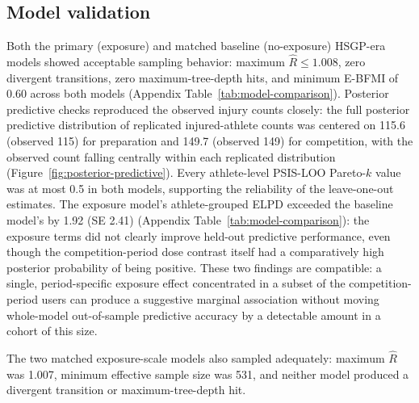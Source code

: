 \subsection{Model validation}
\label{sec:results-validation}
Both the primary (exposure) and matched baseline (no-exposure) HSGP-era models showed acceptable sampling behavior: maximum $\hat{R} \leq 1.008$, zero divergent transitions, zero maximum-tree-depth hits, and minimum E-BFMI of 0.60 across both models (Appendix Table~\ref{tab:model-comparison}). Posterior predictive checks reproduced the observed injury counts closely: the full posterior predictive distribution of replicated injured-athlete counts was centered on 115.6 (observed 115) for preparation and 149.7 (observed 149) for competition, with the observed count falling centrally within each replicated distribution (Figure~\ref{fig:posterior-predictive}). Every athlete-level PSIS-LOO Pareto-$k$ value was at most 0.5 in both models, supporting the reliability of the leave-one-out estimates. The exposure model's athlete-grouped ELPD exceeded the baseline model's by 1.92 (SE 2.41) (Appendix Table~\ref{tab:model-comparison}): the exposure terms did not clearly improve held-out predictive performance, even though the competition-period dose contrast itself had a comparatively high posterior probability of being positive. These two findings are compatible: a single, period-specific exposure effect concentrated in a subset of the competition-period users can produce a suggestive marginal association without moving whole-model out-of-sample predictive accuracy by a detectable amount in a cohort of this size.

The two matched exposure-scale models also sampled adequately: maximum $\hat{R}$ was 1.007, minimum effective sample size was 531, and neither model produced a divergent transition or maximum-tree-depth hit.


